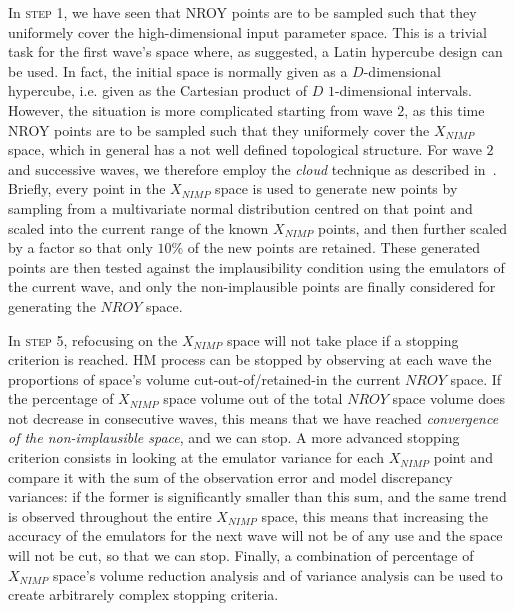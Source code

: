\vspace{0.2cm}
In \textsc{step 1}, we have seen that NROY points are to be sampled such that they uniformely cover the high-dimensional input parameter space. This is a trivial task for the first wave's space where, as suggested, a Latin hypercube design can be used. In fact, the initial space is normally given as a $D$-dimensional hypercube, i.e. given as the Cartesian product of $D$ $1$-dimensional intervals. However, the situation is more complicated starting from wave $2$, as this time NROY points are to be sampled such that they uniformely cover the $X_{NIMP}$ space, which in general has a not well defined topological structure. For wave $2$ and successive waves, we therefore employ the \textit{cloud} technique as described in~\cite{Coveney:2018}. Briefly, every point in the $X_{NIMP}$ space is used to generate new points by sampling from a multivariate normal distribution centred on that point and scaled into the current range of the known $X_{NIMP}$ points, and then further scaled by a factor so that only $10\%$ of the new points are retained. These generated points are then tested against the implausibility condition using the emulators of the current wave, and only the non-implausible points are finally considered for generating the $NROY$ space.


\vspace{0.2cm}
In \textsc{step 5}, refocusing on the $X_{NIMP}$ space will not take place if a stopping criterion is reached. HM process can be stopped by observing at each wave the proportions of space's volume cut-out-of/retained-in the current $NROY$ space. If the percentage of $X_{NIMP}$ space volume out of the total $NROY$ space volume does not decrease in consecutive waves, this means that we have reached \textit{convergence of the non-implausible space}, and we can stop. A more advanced stopping criterion consists in looking at the emulator variance for each $X_{NIMP}$ point and compare it with the sum of the observation error and model discrepancy variances: if the former is significantly smaller than this sum, and the same trend is observed throughout the entire $X_{NIMP}$ space, this means that increasing the accuracy of the emulators for the next wave will not be of any use and the space will not be cut, so that we can stop. Finally, a combination of percentage of $X_{NIMP}$ space's volume reduction analysis and of variance analysis can be used to create arbitrarely complex stopping criteria.




